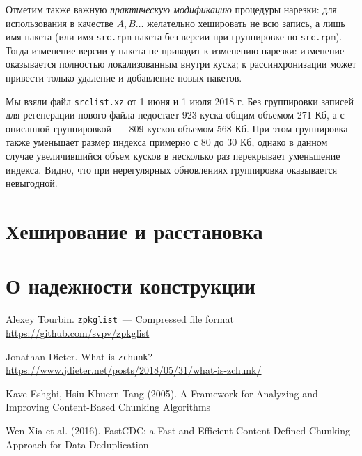 \documentclass[russian,a4paper,12pt]{article}
\begin{document}
Отметим также важную \textit{практическую модификацию} процедуры нарезки: для использования в качестве $A, B\ldots$
желательно хешировать не всю запись, а лишь имя пакета (или имя \verb|src.rpm| пакета без версии при группировке по \verb|src.rpm|).
Тогда изменение версии у пакета не приводит к изменению нарезки: изменение оказывается полностью локализованным внутри куска;
к рассинхронизации может привести только удаление и добавление новых пакетов.

Мы взяли файл \verb|srclist.xz| от 1 июня и 1 июля 2018 г.  Без группировки записей для регенерации нового файла
недостает 923 куска общим объемом 271 Кб, а с описанной группировкой~--- 809 кусков объемом 568 Кб.  При этом группировка
также уменьшает размер индекса примерно с 80 до 30 Кб, однако в данном случае увеличившийся объем кусков в несколько
раз перекрывает уменьшение индекса.  Видно, что при нерегулярных обновлениях группировка оказывается невыгодной.

\section{Хеширование и расстановка}
\section{О надежности конструкции}

\begin{thebibliography}{9}

Alexey Tourbin. \verb|zpkglist|~--- Compressed file format\\
\url{https://github.com/svpv/zpkglist}

Jonathan Dieter. What is \verb|zchunk|?\\
\url{https://www.jdieter.net/posts/2018/05/31/what-is-zchunk/}

Kave Eshghi, Hsiu Khuern Tang (2005).
A Framework for Analyzing and Improving Content-Based Chunking Algorithms

Wen Xia et al. (2016).
FastCDC: a Fast and Efficient Content-Defined Chunking Approach for Data Deduplication

\end{thebibliography}
\end{document}
